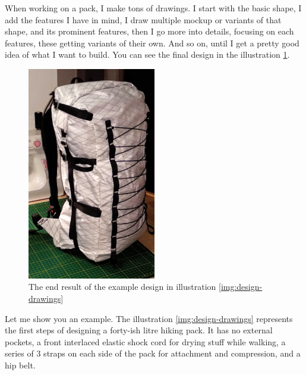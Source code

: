 
When working on a pack, I make tons of drawings. I start with the basic shape, I add the features I have in mind, I draw multiple mockup or variants of that shape, and its prominent features, then I go more into details, focusing on each features, these getting variants of their own. And so on, until I get a pretty good idea of what I want to build. You can see the final design in the illustration \ref{img:pack-side-full}.

\begin{figure}[h]
  \centering
  \includegraphics[width=0.5\textwidth]{media/images/pack-side-full}
  \caption{The end result of the example design in illustration \ref{img:design-drawings}}
  \label{img:pack-side-full}
\end{figure}

Let me show you an example. The illustration \ref{img:design-drawings} represents the first steps of designing a forty-ish litre hiking pack. It has no external pockets, a front interlaced elastic shock cord for drying stuff while walking, a series of 3 straps on each side of the pack for attachment and compression, and a hip belt.


